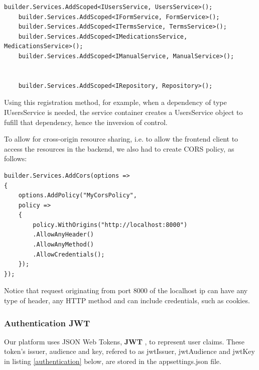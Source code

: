 \begin{lstlisting}[style=sharpc, caption=Adding middlewares using dependency injection and inversion of control]
	builder.Services.AddScoped<IUsersService, UsersService>();
	builder.Services.AddScoped<IFormService, FormService>();
	builder.Services.AddScoped<ITermsService, TermsService>();
	builder.Services.AddScoped<IMedicationsService, MedicationsService>();
	builder.Services.AddScoped<IManualService, ManualService>();


	builder.Services.AddScoped<IRepository, Repository>();
\end{lstlisting}

Using this registration method, for example, when a dependency of type IUsersService is needed, the service container creates a UsersService object to fufill that dependency, hence the inversion of control.

To allow for cross-origin resource sharing, i.e. to allow the frontend client to access the resources in the backend, we also had to create CORS policy, as follows:

\begin{lstlisting}[style=sharpc, caption={Configuring CORS Policy in ASP.NET Core: Allowing Specific Origin with Full Access Control.}]
builder.Services.AddCors(options =>
{
	options.AddPolicy("MyCorsPolicy",
	policy =>
	{
		policy.WithOrigins("http://localhost:8000")
		.AllowAnyHeader()
		.AllowAnyMethod()
		.AllowCredentials();
	});
});
\end{lstlisting}

Notice that request originating from port 8000 of the localhost ip can have any type of header, any HTTP method and can include credentials, such as cookies.
\newpage
\subsubsection{Authentication JWT}

Our platform uses JSON Web Tokens, \textbf{JWT} \cite{rfc7519}, to represent user claims.
These token's issuer, audience and key, refered to as jwtIssuer, jwtAudience and jwtKey in listing \ref{authentication} below, are stored in the appsettings.json file.

